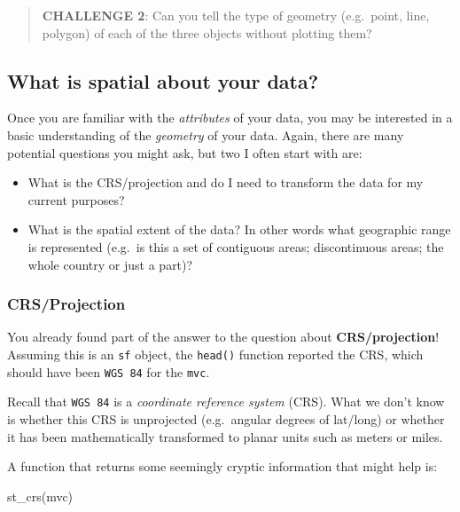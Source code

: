 \documentclass[
]{book}
\newenvironment{Shaded}{\begin{snugshade}}{\end{snugshade}}
\newcommand{\FunctionTok}[1]{\textcolor[rgb]{0.00,0.00,0.00}{#1}}
\newcommand{\NormalTok}[1]{#1}
\providecommand{\tightlist}{%
  \setlength{\itemsep}{0pt}\setlength{\parskip}{0pt}}
\begin{document}
\begin{quote}
\textbf{CHALLENGE 2}: Can you tell the type of geometry (e.g.~point, line, polygon) of each of the three objects without plotting them?
\end{quote}

\hypertarget{what-is-spatial-about-your-data}{%
\subsection{What is spatial about your data?}\label{what-is-spatial-about-your-data}}

Once you are familiar with the \emph{attributes} of your data, you may be interested in a basic understanding of the \emph{geometry} of your data. Again, there are many potential questions you might ask, but two I often start with are:

\begin{itemize}
\tightlist
\item
  What is the CRS/projection and do I need to transform the data for my current purposes?
\item
  What is the spatial extent of the data? In other words what geographic range is represented (e.g.~is this a set of contiguous areas; discontinuous areas; the whole country or just a part)?
\end{itemize}

\hypertarget{crsprojection}{%
\subsubsection{CRS/Projection}\label{crsprojection}}

You already found part of the answer to the question about \textbf{CRS/projection}! Assuming this is an \texttt{sf} object, the \texttt{head()} function reported the CRS, which should have been \texttt{WGS\ 84} for the \texttt{mvc}.

Recall that \texttt{WGS\ 84} is a \emph{coordinate reference system} (CRS). What we don't know is whether this CRS is unprojected (e.g.~angular degrees of lat/long) or whether it has been mathematically transformed to planar units such as meters or miles.

A function that returns some seemingly cryptic information that might help is:

\begin{Shaded}
\begin{Highlighting}[]
\FunctionTok{st\_crs}\NormalTok{(mvc)}
\end{Highlighting}
\end{Shaded}
\end{document}
